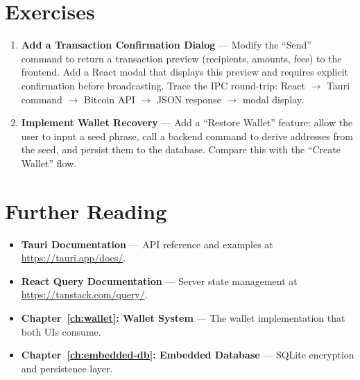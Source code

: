 \section{Exercises}
\label{sec:ch19-exercises}

\begin{enumerate}
  \item \textbf{Add a Transaction Confirmation Dialog} --- Modify the ``Send'' command to return a transaction preview (recipients, amounts, fees) to the frontend. Add a React modal that displays this preview and requires explicit confirmation before broadcasting. Trace the IPC round-trip: React \(\to\) Tauri command \(\to\) Bitcoin API \(\to\) JSON response \(\to\) modal display.

  \item \textbf{Implement Wallet Recovery} --- Add a ``Restore Wallet'' feature: allow the user to input a seed phrase, call a backend command to derive addresses from the seed, and persist them to the database. Compare this with the ``Create Wallet'' flow.
\end{enumerate}

\section{Further Reading}
\label{sec:ch19-reading}

\begin{itemize}
  \item \textbf{Tauri Documentation} --- API reference and examples at \url{https://tauri.app/docs/}.
  \item \textbf{React Query Documentation} --- Server state management at \url{https://tanstack.com/query/}.
  \item \textbf{Chapter~\ref{ch:wallet}: Wallet System} --- The wallet implementation that both UIs consume.
  \item \textbf{Chapter~\ref{ch:embedded-db}: Embedded Database} --- SQLite encryption and persistence layer.
\end{itemize}

